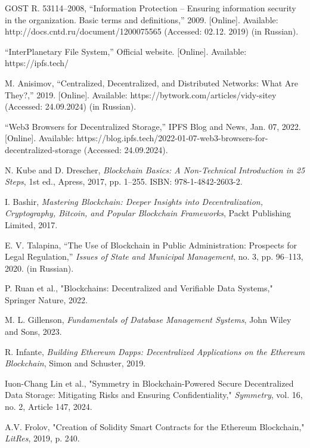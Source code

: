 \documentclass[10pt,conference,a4paper]{IEEEtran_EDM}
\begin{document}
\begin{thebibliography}{00}

 GOST R. 53114–2008, ``Information Protection – Ensuring information security in the organization. Basic terms and definitions,'' 2009. [Online]. Available: http://docs.cntd.ru/document/1200075565 (Accessed: 02.12. 2019) (in Russian).

 ``InterPlanetary File System,'' Official website. [Online]. Available: https://ipfs.tech/

 M. Anisimov, ``Centralized, Decentralized, and Distributed Networks: What Are They?,'' 2019. [Online]. Available: https://bytwork.com/articles/vidy-sitey (Accessed: 24.09.2024) (in Russian).

 ``Web3 Browsers for Decentralized Storage,'' IPFS Blog and News, Jan. 07, 2022. [Online]. Available: https://blog.ipfs.tech/2022-01-07-web3-browsers-for-decentralized-storage (Accessed: 24.09.2024).

 N. Kube and D. Drescher, \textit{Blockchain Basics: A Non-Technical Introduction in 25 Steps}, 1st ed., Apress, 2017, pp. 1–255. ISBN: 978-1-4842-2603-2.

 I. Bashir, \textit{Mastering Blockchain: Deeper Insights into Decentralization, Cryptography, Bitcoin, and Popular Blockchain Frameworks}, Packt Publishing Limited, 2017.

 E. V. Talapina, ``The Use of Blockchain in Public Administration: Prospects for Legal Regulation,'' \textit{Issues of State and Municipal Management}, no. 3, pp. 96–113, 2020. (in Russian).

 P. Ruan et al., "Blockchains: Decentralized and Verifiable Data Systems," Springer Nature, 2022.

 M. L. Gillenson, \textit{Fundamentals of Database Management Systems}, John Wiley and Sons, 2023.

 R. Infante, \textit{Building Ethereum Dapps: Decentralized Applications on the Ethereum Blockchain}, Simon and Schuster, 2019.

 Iuon-Chang Lin et al., "Symmetry in Blockchain-Powered Secure Decentralized Data Storage: Mitigating Risks and Ensuring Confidentiality," \textit{Symmetry}, vol. 16, no. 2, Article 147, 2024.

 A.V. Frolov, "Creation of Solidity Smart Contracts for the Ethereum Blockchain," \textit{LitRes}, 2019, p. 240.


\end{thebibliography}
\end{document}
